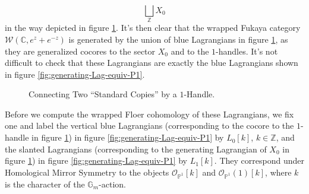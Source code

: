 \begin{exmp}
\[        \bigsqcup_{\mathbb{Z}} X_0
    \]in the way depicted in figure \ref{fig:1-handle-attaching-Z}. It's then clear that the wrapped Fukaya category $\mathcal{W} (\mathbb{C},e^z+e^{-z})$ is generated by the union of blue Lagrangians in figure \ref{fig:1-handle-attaching-Z}, as they are generalized cocores to the sector $X_0$ and to the $1$-handles. It's not difficult to check that these Lagrangians are exactly the blue Lagrangians shown in figure \ref{fig:generating-Lag-equiv-P1}.\par
    \begin{figure}[ht]
        \centering
        \caption{Connecting Two ``Standard Copies'' by a $1$-Handle.}\label{fig:1-handle-attaching-Z}
    \end{figure}
    Before we compute the wrapped Floer cohomology of these Lagrangians, we fix one and label the vertical blue Lagrangians (corresponding to the cocore to the $1$-handle in figure \ref{fig:1-handle-attaching-Z}) in figure \ref{fig:generating-Lag-equiv-P1} by $L_0[k]$, $k\in\mathbb{Z}$, and the slanted Lagrangians (corresponding to the generating Lagrangian of $X_0$ in figure \ref{fig:1-handle-attaching-Z}) in figure \ref{fig:generating-Lag-equiv-P1} by $L_1 [k]$. They correspond under Homological Mirror Symmetry to the objects $\mathcal{O}_{\mathbb{P}^1}[k]$ and $\mathcal{O}_{\mathbb{P}^1} (1) [k]$, where $k$ is the character of the $\mathbb{G}_m$-action.\par

\end{exmp}
